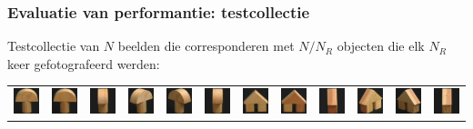 \documentclass[dutch]{beamer}
\theoremstyle{definition}
\theoremstyle{remark}
\theoremstyle{example}
\begin{document}
\frame
{
  \frametitle{Evaluatie van performantie: testcollectie}

  Testcollectie van $N$ beelden die corresponderen met 
  $N/N_R$ objecten die elk $N_R$ keer gefotografeerd werden:

\begin{center}

\begin{tabular}{c@{\ }c@{}c@{}c@{}c@{}c c@{\ }c@{}c@{}c@{}c@{}c}

\includegraphics[width=0.8cm]{coil/beeld-0.eps} &
\includegraphics[width=0.8cm]{coil/beeld-1.eps} &
\includegraphics[width=0.8cm]{coil/beeld-2.eps} &
\includegraphics[width=0.8cm]{coil/beeld-3.eps} &
\includegraphics[width=0.8cm]{coil/beeld-4.eps} &
\includegraphics[width=0.8cm]{coil/beeld-5.eps} &

\includegraphics[width=0.8cm]{coil/beeld-42.eps} &
\includegraphics[width=0.8cm]{coil/beeld-43.eps} &
\includegraphics[width=0.8cm]{coil/beeld-44.eps} &
\includegraphics[width=0.8cm]{coil/beeld-45.eps} &
\includegraphics[width=0.8cm]{coil/beeld-46.eps} &
\includegraphics[width=0.8cm]{coil/beeld-47.eps} \\


\end{tabular}
\end{center}}
\end{document}
